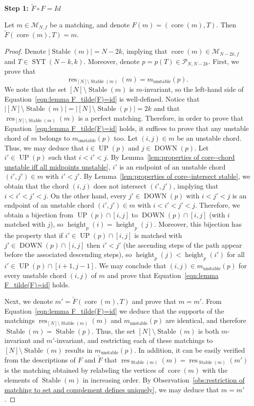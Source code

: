 \documentclass[ALCO]{cedram}
\makeatletter
\newcommand{\Syt}{\operatorname{SYT}}
\newcommand{\Stable}{\operatorname{Stable}}
\newcommand{\height}{\operatorname{height}}
\newcommand{\core}{\operatorname{core}}
\newcommand{\res}{\operatorname{res}}
\newcommand{\UP}{\operatorname{UP}}
\newcommand{\DOWN}{\operatorname{DOWN}}
\newcommand{\M}{\mathcal{M}}
\newcommand{\Pcal}{\mathcal{P}}
\newcommand{\proofstep}[1]{%
  \par%
  \addvspace{\medskipamount}%
  \textbf{#1\@addpunct{.}}\enspace\ignorespaces
}
\makeatother
\begin{document}
\proofstep{Step 1: $\tilde{F}\circ F = Id$}
\begin{lemma}
\label{lem:F_tilde(F)=id}
    Let $m \in \M_{N,f}$ be a matching, and denote $F(m) = (\core(m),T)$. Then $\tilde{F}(\core(m),T) = m$.
\end{lemma}
\begin{proof}
    Denote $\left|\Stable(m)\right| = N-2k$, implying that $\core(m) \in \M_{N-2k,f}$ and $T \in \Syt(N-k,k)$. Moreover, denote $p=p(T) \in \Pcal_{N,N-2k}$. First, we prove that
    \begin{equation}
    \label{eqn:lemma F_tilde(F)=id}
        \res_{[N]\setminus\Stable(m)}(m) = m_{\text{unstable}}(p).
    \end{equation}
    We note that the set $[N] \setminus \Stable(m)$ is $m$-invariant, so the left-hand side of Equation~\eqref{eqn:lemma F_tilde(F)=id} is well-defined. Notice that $|[N]\setminus\Stable(m)| = |[N]\setminus\Stable(p)| = 2k$ and that $\res_{[N]\setminus\Stable(m)}(m)$ is a perfect matching. Therefore, in order to prove that Equation~\eqref{eqn:lemma F_tilde(F)=id} holds, it suffices to prove that any unstable chord of $m$ belongs to $m_{\text{unstable}}(p)$ too. Let $(i,j) \in m$ be an unstable chord. Thus, we may deduce that $i \in \UP(p)$ and $j \in \DOWN(p)$. Let $i' \in \UP(p)$ such that $i < i' < j$. By Lemma~\ref{lem:properties of core--chord unstable iff all midpoints unstable}, $i'$ is an endpoint of an unstable chord $(i',j') \in m$ with $i' < j'$. By Lemma~\ref{lem:properties of core--intersect stable}, we obtain that the chord $(i,j)$ does not intersect $(i',j')$, implying that $i < i' < j' < j$. On the other hand, every $j' \in \DOWN(p)$ with $i < j' < j$ is an endpoint of an unstable chord $(i',j') \in m$ with $i < i' < j' < j$. Therefore, we obtain a bijection from $\UP(p) \cap [i,j]$ to $\DOWN(p) \cap [i,j]$ (with $i$ matched with $j$), so $\height_p(i) = \height_p(j)$. Moreover, this bijection has the property that if $i' \in \UP(p) \cap [i,j]$ is matched with $j' \in \DOWN(p) \cap [i,j]$ then $i' < j'$ (\ie the ascending steps of the path appear before the associated descending steps), so $\height_p(j) < \height_p(i')$ for all $i' \in \UP(p) \cap [i+1,j-1]$. We may conclude that $(i,j) \in m_{\text{unstable}}(p)$ for every unstable chord $(i,j)$ of $m$ and prove that Equation~\eqref{eqn:lemma F_tilde(F)=id} holds.

    Next, we denote $m' = \tilde{F}(\core(m),T)$ and prove that $m=m'$. From Equation~\eqref{eqn:lemma F_tilde(F)=id} we deduce that the supports of the matchings $\res_{[N]\setminus\Stable(m)}(m)$ and $m_{\text{unstable}}(p)$ are identical, and therefore $\Stable(m) = \Stable(p)$. Thus, the set $[N]\setminus\Stable(m)$ is both $m$-invariant and $m'$-invariant, and restricting each of these matchings to $[N]\setminus\Stable(m)$ results in $m_{\text{unstable}}(p)$. In addition, it can be easily verified from the descriptions of $F$ and $\tilde{F}$ that $\res_{\Stable(m)}(m) = \res_{\Stable(m)}(m')$ is the matching obtained by relabeling the vertices of $\core(m)$ with the elements of $\Stable(m)$ in increasing order. By Observation~\ref{obs:restriction of matching to set and complement defines uniquely}, we may deduce that $m=m'$.
\end{proof}
\end{document}
